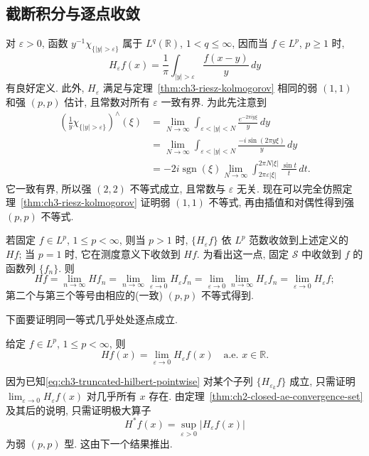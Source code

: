 \subsection{截断积分与逐点收敛}
\label{sec:ch3-truncated-integrals-pointwise-convergence}

对 $\varepsilon>0$, 函数 $y^{-1}\chi_{\{|y|>\varepsilon\}}$ 属于 $L^q(\mathbb R)$, $1<q\le\infty$, 因而当 $f\in L^p$, $p\ge1$ 时,
\[
 H_\varepsilon f(x)=\frac1\pi\int_{|y|>\varepsilon}\frac{f(x-y)}y\,dy
\]
有良好定义. 此外, $H_\varepsilon$ 满足与定理~\ref{thm:ch3-riesz-kolmogorov} 相同的弱 $(1,1)$ 和强 $(p,p)$ 估计, 且常数对所有 $\varepsilon$ 一致有界. 为此先注意到
\[
\begin{aligned}
 \left(\frac1y\chi_{\{|y|>\varepsilon\}}\right)^{\wedge}(\xi)
 &=\lim_{N\to\infty}\int_{\varepsilon<|y|<N}\frac{e^{-2\pi iy\xi}}y\,dy\\
 &=\lim_{N\to\infty}\int_{\varepsilon<|y|<N}\frac{-i\sin(2\pi y\xi)}y\,dy\\
 &=-2i\operatorname{sgn}(\xi)
   \lim_{N\to\infty}\int_{2\pi\varepsilon|\xi|}^{2\pi N|\xi|}\frac{\sin t}{t}\,dt.
\end{aligned}
\]
它一致有界, 所以强 $(2,2)$ 不等式成立, 且常数与 $\varepsilon$ 无关. 现在可以完全仿照定理~\ref{thm:ch3-riesz-kolmogorov} 证明弱 $(1,1)$ 不等式, 再由插值和对偶性得到强 $(p,p)$ 不等式.

若固定 $f\in L^p$, $1\le p<\infty$, 则当 $p>1$ 时, $\{H_\varepsilon f\}$ 依 $L^p$ 范数收敛到上述定义的 $Hf$; 当 $p=1$ 时, 它在测度意义下收敛到 $Hf$. 为看出这一点, 固定 $\mathcal S$ 中收敛到 $f$ 的函数列 $\{f_n\}$. 则
\[
 Hf=\lim_{n\to\infty}Hf_n
 =\lim_{n\to\infty}\lim_{\varepsilon\to0}H_\varepsilon f_n
 =\lim_{\varepsilon\to0}\lim_{n\to\infty}H_\varepsilon f_n
 =\lim_{\varepsilon\to0}H_\varepsilon f;
\]
第二个与第三个等号由相应的(一致) $(p,p)$ 不等式得到.

下面要证明同一等式几乎处处逐点成立.

\hypertarget{chapter-03-page-068}{}
\begin{Theorem}
\label{thm:ch3-truncated-hilbert-pointwise}
给定 $f\in L^p$, $1\le p<\infty$, 则
\begin{equation}
\label{eq:ch3-truncated-hilbert-pointwise}
 Hf(x)=\lim_{\varepsilon\to0}H_\varepsilon f(x)
 \quad\text{a.e. }x\in\mathbb R.
\end{equation}
\end{Theorem}

因为已知\eqref{eq:ch3-truncated-hilbert-pointwise} 对某个子列 $\{H_{\varepsilon_k}f\}$ 成立, 只需证明 $\lim_{\varepsilon\to0}H_\varepsilon f(x)$ 对几乎所有 $x$ 存在. 由定理~\ref{thm:ch2-closed-ae-convergence-set} 及其后的说明, 只需证明极大算子
\[
 H^*f(x)=\sup_{\varepsilon>0}|H_\varepsilon f(x)|
\]
为弱 $(p,p)$ 型. 这由下一个结果推出.

